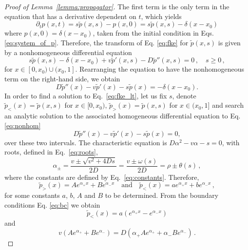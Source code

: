 \documentclass[preprint,12pt]{elsarticle}
\numberwithin{equation}{section}
\theoremstyle{plain} \newtheorem{theorem}{Theorem}[section]
\theoremstyle{plain} \newtheorem{proposition}[theorem]{Proposition}
\theoremstyle{plain} \newtheorem{lemma}[theorem]{Lemma}
\theoremstyle{plain} \newtheorem{corollary}[theorem]{Corollary}
\theoremstyle{definition} \newtheorem{definition}[theorem]{Definition}
\theoremstyle{definition} \newtheorem{notation}[theorem]{Notation}
\theoremstyle{remark} \newtheorem{remark}[theorem]{Remark}
\theoremstyle{remark} \newtheorem{remarks}[theorem]{Remarks}
\theoremstyle{remark} \newtheorem{algorithm2}[theorem]{Algorithm}
\theoremstyle{remark} \newtheorem{example}[theorem]{Example}
\begin{document}
\begin{appendices}
\begin{proof}[Proof of Lemma~\ref{lemma:propagator}]
The first term is the only term in the equation that has a derivative dependent on $t$, which yields
\begin{equation*}
\partial_t p(x,t) = s\tilde{p}(x,s) - p(x,0) = s \tilde{p}(x,s) - \delta(x-x_0)
\end{equation*}
where $p(x,0) = \delta(x-x_0)$, taken from the initial condition in Eqs. \eqref{eq:system_of_p}. Therefore, the transform of Eq. \eqref{eq:fke}
for  $\tilde{p}(x,s)$ is given by a nonhomogeneous differential equation
\begin{equation}
\label{eq:fke_lt}
	s\tilde{p}(x,s) - \delta(x-x_0)
	+v\tilde{p}'(x,s)
	-D\tilde{p}''(x,s)
	=0\,,\quad s\geq 0\,,
\end{equation}
for $x\in[0,x_0)\cup(x_0,1]$. Rearranging the equation to have the nonhomogeneous term on the right-hand side, we obtain
\begin{equation}\label{eq:nonhom}
	D\tilde{p}''(x)-v\tilde{p}'(x)-s\tilde{p}(x)=-\delta(x-x_0).
\end{equation}
In order to find a solution to Eq.~\eqref{eq:fke_lt},
let us fix $s$, denote $\tilde{p}_<(x)=\tilde{p}(x,s)$ for $x \in [0,x_0)$,
$\tilde{p}_>(x)=\tilde{p}(x,s)$ for $x \in(x_0,1]$ and search an analytic solution to the associated homogeneous differential equation to Eq. \eqref{eq:nonhom}
\begin{equation*}
	D\tilde{p}''(x)-v\tilde{p}'(x)-s\tilde{p}(x)=0,
\end{equation*}
over these two intervals.
The characteristic equation is
$
	D\alpha^2-v\alpha-s=0$,
with roots, defined in Eq.~\eqref{eq:roots}, 
\begin{equation*}
	\alpha_\pm
	=\frac{v\pm\sqrt{v^2+4Ds}}{2D}
	=\frac{v\pm\omega(s)}{2D}
    =\rho\pm\theta(s)\,,
\end{equation*}
where the constants are defined by Eq.~\eqref{eq:constants}. Therefore,
\begin{equation*}
\tilde{p}_>(x)=Ae^{\alpha_+ x} + Be^{\alpha_- x}
\quad\text{and}\quad
\tilde{p}_<(x)=ae^{\alpha_+ x}+be^{\alpha_- x}\,,
\end{equation*}
for some constants $a$, $b$, $A$ and $B$ to be determined.
From the boundary conditions Eq. \eqref{eq:bc} we obtain
\begin{equation*}
	\tilde{p}_<(x)=a(e^{\alpha_+ x}-e^{\alpha_- x})
\end{equation*}
and
\begin{equation*}
	v(Ae^{\alpha_+}+Be^{\alpha_- }) = D(\alpha_+ Ae^{\alpha_+} +\alpha_- Be^{\alpha_-})\,.
\end{equation*}

\end{proof}
\end{appendices}
\end{document}
